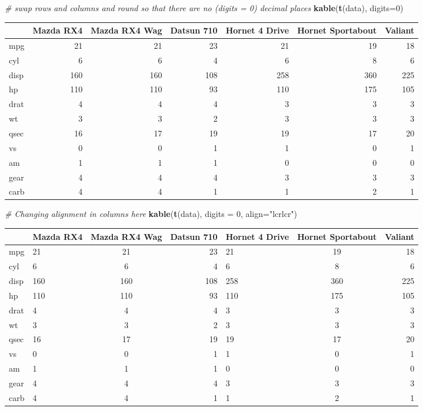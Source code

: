 \documentclass[]{article}
\newenvironment{Shaded}{\begin{snugshade}}{\end{snugshade}}
\newcommand{\KeywordTok}[1]{\textcolor[rgb]{0.13,0.29,0.53}{\textbf{#1}}}
\newcommand{\DataTypeTok}[1]{\textcolor[rgb]{0.13,0.29,0.53}{#1}}
\newcommand{\DecValTok}[1]{\textcolor[rgb]{0.00,0.00,0.81}{#1}}
\newcommand{\StringTok}[1]{\textcolor[rgb]{0.31,0.60,0.02}{#1}}
\newcommand{\CommentTok}[1]{\textcolor[rgb]{0.56,0.35,0.01}{\textit{#1}}}
\newcommand{\NormalTok}[1]{#1}
\begin{document}
\begin{Shaded}
\begin{Highlighting}[]
\CommentTok{# swap rows and columns and round so that there are no (digits = 0) decimal places}
\KeywordTok{kable}\NormalTok{(}\KeywordTok{t}\NormalTok{(data), }\DataTypeTok{digits=}\DecValTok{0}\NormalTok{)}
\end{Highlighting}
\end{Shaded}

\begin{longtable}[]{@{}lrrrrrr@{}}
\toprule
& Mazda RX4 & Mazda RX4 Wag & Datsun 710 & Hornet 4 Drive & Hornet
Sportabout & Valiant\tabularnewline
\midrule
\endhead
mpg & 21 & 21 & 23 & 21 & 19 & 18\tabularnewline
cyl & 6 & 6 & 4 & 6 & 8 & 6\tabularnewline
disp & 160 & 160 & 108 & 258 & 360 & 225\tabularnewline
hp & 110 & 110 & 93 & 110 & 175 & 105\tabularnewline
drat & 4 & 4 & 4 & 3 & 3 & 3\tabularnewline
wt & 3 & 3 & 2 & 3 & 3 & 3\tabularnewline
qsec & 16 & 17 & 19 & 19 & 17 & 20\tabularnewline
vs & 0 & 0 & 1 & 1 & 0 & 1\tabularnewline
am & 1 & 1 & 1 & 0 & 0 & 0\tabularnewline
gear & 4 & 4 & 4 & 3 & 3 & 3\tabularnewline
carb & 4 & 4 & 1 & 1 & 2 & 1\tabularnewline
\bottomrule
\end{longtable}

\begin{Shaded}
\begin{Highlighting}[]
\CommentTok{# Changing alignment in columns here}
\KeywordTok{kable}\NormalTok{(}\KeywordTok{t}\NormalTok{(data), }\DataTypeTok{digits =} \DecValTok{0}\NormalTok{, }\DataTypeTok{align=}\StringTok{"lcrlcr"}\NormalTok{)}
\end{Highlighting}
\end{Shaded}

\begin{longtable}[]{@{}llcrlcr@{}}
\toprule
& Mazda RX4 & Mazda RX4 Wag & Datsun 710 & Hornet 4 Drive & Hornet
Sportabout & Valiant\tabularnewline
\midrule
\endhead
mpg & 21 & 21 & 23 & 21 & 19 & 18\tabularnewline
cyl & 6 & 6 & 4 & 6 & 8 & 6\tabularnewline
disp & 160 & 160 & 108 & 258 & 360 & 225\tabularnewline
hp & 110 & 110 & 93 & 110 & 175 & 105\tabularnewline
drat & 4 & 4 & 4 & 3 & 3 & 3\tabularnewline
wt & 3 & 3 & 2 & 3 & 3 & 3\tabularnewline
qsec & 16 & 17 & 19 & 19 & 17 & 20\tabularnewline
vs & 0 & 0 & 1 & 1 & 0 & 1\tabularnewline
am & 1 & 1 & 1 & 0 & 0 & 0\tabularnewline
gear & 4 & 4 & 4 & 3 & 3 & 3\tabularnewline
carb & 4 & 4 & 1 & 1 & 2 & 1\tabularnewline
\bottomrule
\end{longtable}
\end{document}
